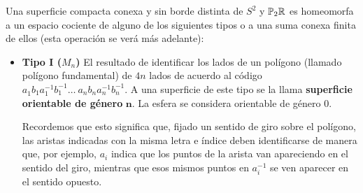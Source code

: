 \documentclass[GTS.tex]{subfiles}
\begin{document}
\begin{teorema}
Una superficie compacta conexa y sin borde distinta de $S^2$ y $\mathbb{P}_2\mathbb{R}$ es homeomorfa a un espacio cociente de alguno de los siguientes tipos o a una suma conexa finita de ellos (esta operación se verá más adelante):
\begin{itemize}
\item \textbf{Tipo I ($M_n$)}
El resultado de identificar los lados de un polígono (llamado polígono fundamental) de $4n$ lados de acuerdo al código $a^{}_1 b^{}_1 a^{-1}_1 b^{-1}_1\dots\ a^{}_n b^{}_n a_n^{-1} b_n^{-1}$. A una superficie de este tipo se la llama \textbf{superficie orientable de género} $\mathbf{n}$. La esfera se considera orientable de género $0$.

Recordemos que esto significa que, fijado un sentido de giro sobre el polígono, las aristas indicadas con la misma letra e índice deben identificarse de manera que, por ejemplo,  $a_i$ indica que los puntos de la arista van apareciendo en el sentido del giro, mientras que esos mismos puntos en  $a_i^{-1}$ se ven aparecer  en el sentido opuesto.

\begin{center}
\end{center}
\end{itemize}
\end{teorema}
\end{document}
